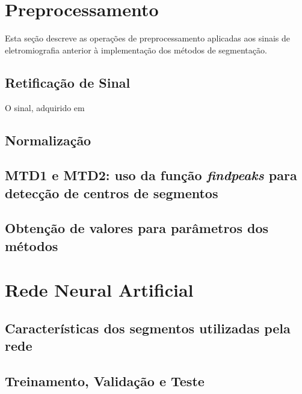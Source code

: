 \section{Preprocessamento}

Esta seção descreve as operações de preprocessamento aplicadas aos sinais de eletromiografia anterior à implementação dos métodos de segmentação.

\subsection{Retificação de Sinal}

O sinal, adquirido em 

\subsection{Normalização}


\subsection{MTD1 e MTD2: uso da função \emph{findpeaks} para detecção de centros de segmentos}

\subsection{Obtenção de valores para parâmetros dos métodos}

\section{Rede Neural Artificial}

\subsection{Características dos segmentos utilizadas pela rede}

\subsection{Treinamento, Validação e Teste}